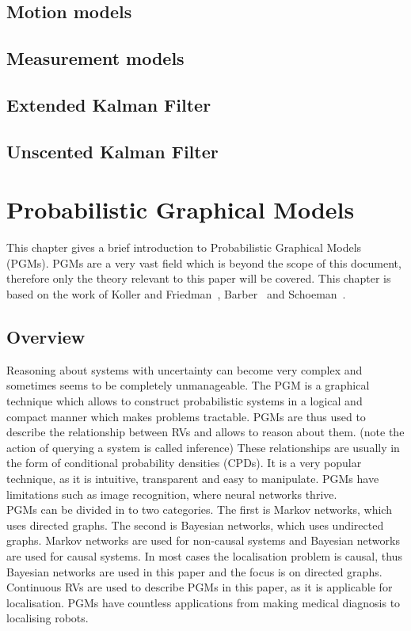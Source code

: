\documentclass[12pt,oneside,openany,a4paper, %
afrikaans,english,
]{memoir}
\numberwithin{equation}{chapter}
\begin{document}
\section{Motion models}
\section{Measurement models}
\section{Extended Kalman Filter}
\section{Unscented Kalman Filter}
\chapter{Probabilistic Graphical Models}
This chapter gives a brief introduction to Probabilistic Graphical Models (PGMs). PGMs are a very vast field which is beyond the scope of this document, therefore only the theory relevant to this paper will be covered. This chapter is based on the work of Koller and Friedman~\cite{koller}, Barber~\cite{barber} and Schoeman~\citep{JC}.
\section{Overview}
Reasoning about systems with uncertainty can become very complex and sometimes seems to be completely unmanageable. The PGM is a graphical technique which allows to construct probabilistic systems in a logical and compact manner which makes problems tractable. PGMs are thus used to describe the relationship between RVs and allows to reason about them. (note the action of querying a system is called inference) These relationships are usually in the form of conditional probability densities (CPDs). It is a very popular technique, as it is intuitive, transparent and easy to manipulate. PGMs have limitations such as image recognition, where neural networks thrive.\\
PGMs can be divided in to two categories. The first is Markov networks, which uses directed graphs. The second is Bayesian networks, which uses undirected graphs. Markov networks are used for non-causal systems and Bayesian networks are used for causal systems. In most cases the localisation problem is causal, thus Bayesian networks are used in this paper and the focus is on directed graphs.\\
Continuous RVs are used to describe PGMs in this paper, as it is applicable for localisation. PGMs have countless applications from making medical diagnosis to localising robots.
\end{document}
